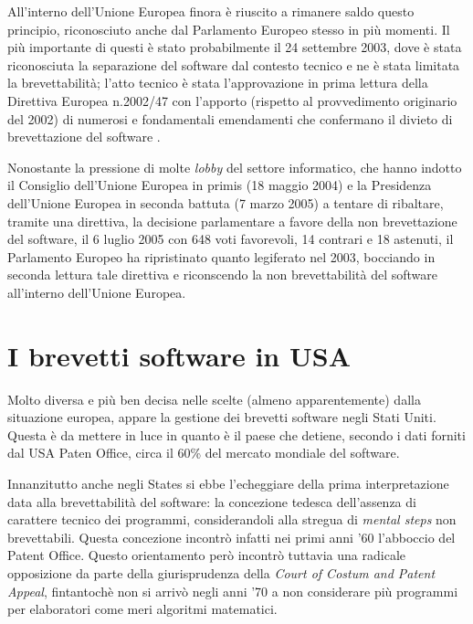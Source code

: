 All'interno dell'Unione Europea finora è riuscito a rimanere saldo questo principio, riconosciuto anche dal Parlamento Europeo stesso in più momenti. Il più importante di questi è stato probabilmente il 24 settembre 2003, dove è stata riconosciuta la separazione del software dal contesto tecnico e ne è stata limitata la brevettabilità; l'atto tecnico è stata l'approvazione in prima lettura della Direttiva Europea n.2002/47 con l'apporto (rispetto al provvedimento originario del 2002) di numerosi e fondamentali emendamenti che confermano il divieto di brevettazione del software . 

Nonostante la pressione di molte \textit{lobby} del settore informatico, che hanno indotto il Consiglio dell'Unione Europea in primis (18 maggio 2004) e la Presidenza dell'Unione Europea in seconda battuta (7 marzo 2005) a tentare di ribaltare, tramite una direttiva, la decisione parlamentare a favore della non brevettazione del software, il 6 luglio 2005 con 648 voti favorevoli, 14 contrari e 18 astenuti, il Parlamento Europeo ha ripristinato quanto legiferato nel 2003, bocciando in seconda lettura tale direttiva e riconscendo la non brevettabilità del software all'interno dell'Unione Europea.

\section{I brevetti software in USA}

Molto diversa e più ben decisa nelle scelte (almeno apparentemente) dalla situazione europea, appare la gestione dei brevetti software negli Stati Uniti. Questa è da mettere in luce in quanto è il paese che detiene, secondo i dati forniti dal USA Paten Office, circa il 60\% del mercato mondiale del software.

Innanzitutto anche negli States si ebbe l'echeggiare della prima interpretazione data alla brevettabilità del software: la concezione tedesca dell'assenza di carattere tecnico dei programmi, considerandoli alla stregua di \textit{mental steps} non brevettabili. Questa concezione incontrò infatti nei primi anni '60 l'abboccio del Patent Office. Questo orientamento però incontrò tuttavia una radicale opposizione da parte della giurisprudenza della \textit{Court of Costum and Patent Appeal}, fintantochè non si arrivò negli anni '70 a non considerare più programmi per elaboratori come meri algoritmi matematici.


